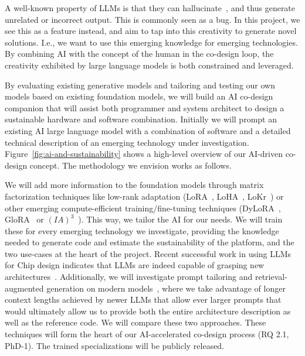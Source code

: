 \documentclass[a4wide,twocolumn]{article}
\begin{document}
A well-known property of LLMs is that they can hallucinate~\cite{wei2022emergent,zhang_sirens_2023}, and thus generate unrelated or incorrect output. This is commonly seen as a bug. In this project, we see this as a feature instead, and aim to tap into this creativity to generate novel solutions. I.e., we want to use this emerging knowledge for emerging technologies. By combining AI with the concept of the human in the co-design loop, the creativity exhibited by large language models is both constrained and leveraged.

By evaluating existing generative models and tailoring and testing our own models based on existing foundation models, we will build an AI co-design companion that will assist both programmer and system architect to design a sustainable hardware and software combination. Initially we will prompt an existing AI large language model with a combination of software and a detailed technical description of an emerging technology under investigation. Figure~\ref{fig:ai-and-sustainability} shows a high-level overview of our AI-driven co-design concept. The methodology we envision works as follows.

We will add more information to the foundation models through matrix factorization techniques like low-rank adaptation (LoRA~\cite{hu_lora_2021}, LoHA~\cite{hyeon-woo_fedpara_2021}, LoKr~\cite{edalati_krona_2022}) or other emerging compute-efficient training/fine-tuning techniques (DyLoRA~\cite{valipour_dylora_2023}, GloRA~\cite{chavan_one-for-all_2023} or $(IA)^3$~\cite{liu_few-shot_2022}). This way, we tailor the AI for our needs. We will train these for every emerging technology we investigate, providing the knowledge needed to generate code and estimate the sustainability of the platform, and the two use-cases at the heart of the project. Recent successful work in using LLMs for Chip design indicates that LLMs are indeed capable of grasping new architectures~\cite{liu_chipnemo_2023}. Additionally, we will investigate prompt tailoring and retrieval-augmented generation on modern models~\cite{xu_expertprompting_2023,gao_prompt_2023,lin_ten_2023}, where we take advantage of longer context lengths achieved by newer LLMs that allow ever larger prompts that would ultimately allow us to provide both the entire architecture description as well as the reference code. We will compare these two approaches. These techniques will form the heart of our AI-accelerated co-design process (RQ 2.1, PhD-1). The trained specializations will be publicly released.
\end{document}
